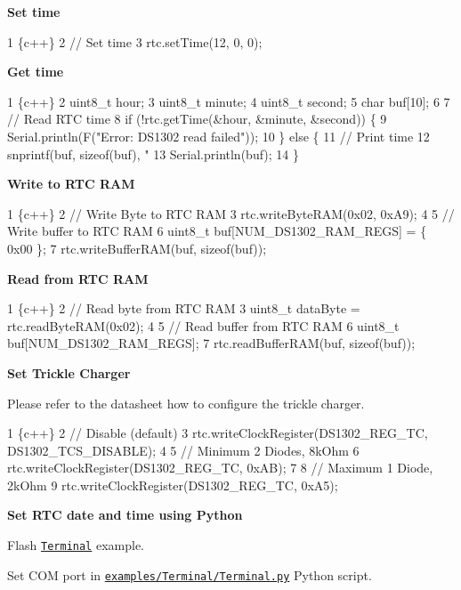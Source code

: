 {\bfseries Set time}


\begin{DoxyCode}
1 \{c++\}
2 // Set time
3 rtc.setTime(12, 0, 0);
\end{DoxyCode}


{\bfseries Get time}


\begin{DoxyCode}
1 \{c++\}
2 uint8\_t hour;
3 uint8\_t minute;
4 uint8\_t second;
5 char buf[10];
6 
7 // Read RTC time
8 if (!rtc.getTime(&hour, &minute, &second)) \{
9     Serial.println(F("Error: DS1302 read failed"));
10 \} else \{    
11     // Print time
12     snprintf(buf, sizeof(buf), "%
13     Serial.println(buf);
14 \}
\end{DoxyCode}


{\bfseries Write to R\+TC R\+AM}


\begin{DoxyCode}
1 \{c++\}
2 // Write Byte to RTC RAM
3 rtc.writeByteRAM(0x02, 0xA9);
4 
5 // Write buffer to RTC RAM
6 uint8\_t buf[NUM\_DS1302\_RAM\_REGS] = \{ 0x00 \};
7 rtc.writeBufferRAM(buf, sizeof(buf));
\end{DoxyCode}


{\bfseries Read from R\+TC R\+AM}


\begin{DoxyCode}
1 \{c++\}
2 // Read byte from RTC RAM
3 uint8\_t dataByte = rtc.readByteRAM(0x02);
4 
5 // Read buffer from RTC RAM
6 uint8\_t buf[NUM\_DS1302\_RAM\_REGS];
7 rtc.readBufferRAM(buf, sizeof(buf));
\end{DoxyCode}


{\bfseries Set Trickle Charger}

Please refer to the datasheet how to configure the trickle charger.


\begin{DoxyCode}
1 \{c++\}
2 // Disable (default)
3 rtc.writeClockRegister(DS1302\_REG\_TC, DS1302\_TCS\_DISABLE);
4 
5 // Minimum 2 Diodes, 8kOhm
6 rtc.writeClockRegister(DS1302\_REG\_TC, 0xAB);
7 
8 // Maximum 1 Diode, 2kOhm
9 rtc.writeClockRegister(DS1302\_REG\_TC, 0xA5);
\end{DoxyCode}


{\bfseries Set R\+TC date and time using Python}

Flash \href{https://github.com/Erriez/ErriezDS1302/blob/master/examples/Terminal/Terminal.ino}{\tt Terminal} example.

Set C\+OM port in \href{https://github.com/Erriez/ErriezDS1302/blob/master/examples/Terminal/Terminal.py}{\tt examples/\+Terminal/\+Terminal.\+py} Python script.

